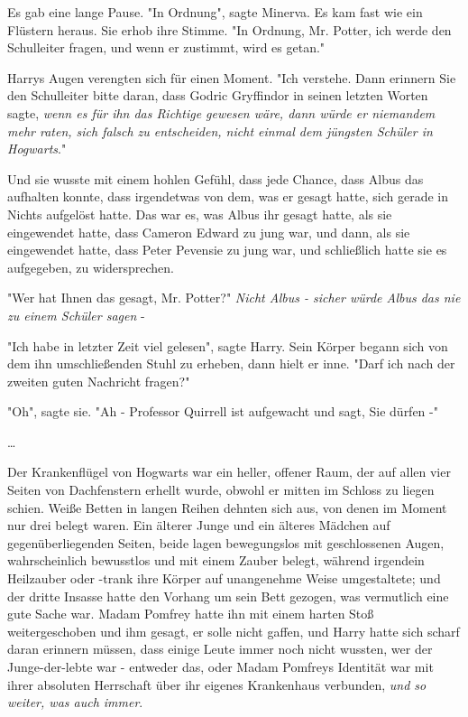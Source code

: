 {Es gab eine lange Pause. "In Ordnung", sagte Minerva. Es kam fast wie ein Flüstern heraus. Sie erhob ihre Stimme. "In Ordnung, Mr. Potter, ich werde den Schulleiter fragen, und wenn er zustimmt, wird es getan."

Harrys Augen verengten sich für einen Moment. "Ich verstehe. Dann erinnern Sie den Schulleiter bitte daran, dass Godric Gryffindor in seinen letzten Worten sagte, \emph{wenn es für ihn das Richtige gewesen wäre, dann würde er niemandem mehr raten, sich falsch zu entscheiden, nicht einmal dem jüngsten Schüler in Hogwarts}."

Und sie wusste mit einem hohlen Gefühl, dass jede Chance, dass Albus das aufhalten konnte, dass irgendetwas von dem, was er gesagt hatte, sich gerade in Nichts aufgelöst hatte. Das war es, was Albus ihr gesagt hatte, als sie eingewendet hatte, dass Cameron Edward zu jung war, und dann, als sie eingewendet hatte, dass Peter Pevensie zu jung war, und schließlich hatte sie es aufgegeben, zu widersprechen.

"Wer hat Ihnen das gesagt, Mr. Potter?" \emph{Nicht Albus - sicher würde Albus das nie zu einem Schüler sagen} -

"Ich habe in letzter Zeit viel gelesen", sagte Harry. Sein Körper begann sich von dem ihn umschließenden Stuhl zu erheben, dann hielt er inne. "Darf ich nach der zweiten guten Nachricht fragen?"

"Oh", sagte sie. "Ah - Professor Quirrell ist aufgewacht und sagt, Sie dürfen -"

…

Der Krankenflügel von Hogwarts war ein heller, offener Raum, der auf allen vier Seiten von Dachfenstern erhellt wurde, obwohl er mitten im Schloss zu liegen schien. Weiße Betten in langen Reihen dehnten sich aus, von denen im Moment nur drei belegt waren. Ein älterer Junge und ein älteres Mädchen auf gegenüberliegenden Seiten, beide lagen bewegungslos mit geschlossenen Augen, wahrscheinlich bewusstlos und mit einem Zauber belegt, während irgendein Heilzauber oder -trank ihre Körper auf unangenehme Weise umgestaltete; und der dritte Insasse hatte den Vorhang um sein Bett gezogen, was vermutlich eine gute Sache war. Madam Pomfrey hatte ihn mit einem harten Stoß weitergeschoben und ihm gesagt, er solle nicht gaffen, und Harry hatte sich scharf daran erinnern müssen, dass einige Leute immer noch nicht wussten, wer der Junge-der-lebte war - entweder das, oder Madam Pomfreys Identität war mit ihrer absoluten Herrschaft über ihr eigenes Krankenhaus verbunden, \emph{und so weiter, was auch immer}.

}
